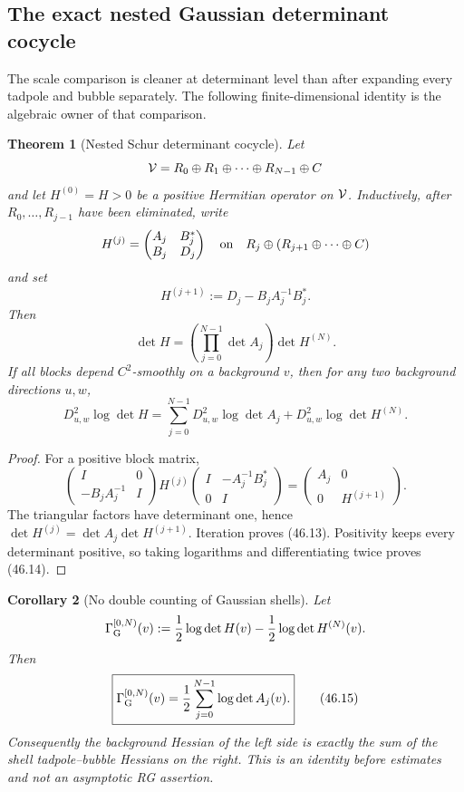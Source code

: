 \documentclass[11pt,oneside]{book}
\newtheorem{theorem}{Theorem}[chapter]
\newtheorem{corollary}[theorem]{Corollary}
\theoremstyle{definition}
\theoremstyle{remark}
\begin{document}
\subsection{The exact nested Gaussian determinant cocycle}

The scale comparison is cleaner at determinant level than after
expanding every tadpole and bubble separately.  The following
finite-dimensional identity is the algebraic owner of that
comparison.

\begin{theorem}[Nested Schur determinant cocycle]
\label{thm:e8v46-Schur-cocycle}
Let
\[
 {\cal V}=R_0\oplus R_1\oplus\cdots\oplus R_{N-1}\oplus C
\]
and let \(H^{(0)}=H>0\) be a positive Hermitian operator on
\({\cal V}\).  Inductively, after \(R_0,\ldots,R_{j-1}\) have been
eliminated, write
\[
 H^{(j)}
 =\begin{pmatrix}A_j&B_j^*\\ B_j&D_j\end{pmatrix}
 \quad\hbox{on}\quad
 R_j\oplus(R_{j+1}\oplus\cdots\oplus C)
\]
and set
\[
 H^{(j+1)}:=D_j-B_jA_j^{-1}B_j^*.                             \tag{46.12}
\]
Then
\[
 \boxed{\det H=\left(\prod_{j=0}^{N-1}\det A_j\right)
                 \det H^{(N)}.}                              \tag{46.13}
\]
If all blocks depend \(C^2\)-smoothly on a background \(v\), then
for any two background directions \(u,w\),
\[
 D^2_{u,w}\log\det H
 =\sum_{j=0}^{N-1}D^2_{u,w}\log\det A_j
  +D^2_{u,w}\log\det H^{(N)}.                                \tag{46.14}
\]
\end{theorem}

\begin{proof}
For a positive block matrix,
\[
 \begin{pmatrix}I&0\\-B_jA_j^{-1}&I\end{pmatrix}
 H^{(j)}
 \begin{pmatrix}I&-A_j^{-1}B_j^*\\0&I\end{pmatrix}
 =\begin{pmatrix}A_j&0\\0&H^{(j+1)}\end{pmatrix}.
\]
The triangular factors have determinant one, hence
\(\det H^{(j)}=\det A_j\det H^{(j+1)}\).  Iteration proves
(46.13).  Positivity keeps every determinant positive, so taking
logarithms and differentiating twice proves (46.14).
\end{proof}

\begin{corollary}[No double counting of Gaussian shells]
\label{cor:e8v46-shell-no-double-count}
Let
\[
 \Gamma^{[0,N)}_{\rm G}(v)
 :=\frac12\log\det H(v)-\frac12\log\det H^{(N)}(v).
\]
Then
\[
 \boxed{\Gamma^{[0,N)}_{\rm G}(v)
 =\frac12\sum_{j=0}^{N-1}\log\det A_j(v).}                    \tag{46.15}
\]
Consequently the background Hessian of the left side is exactly
the sum of the shell tadpole--bubble Hessians on the right.  This is
an identity before estimates and not an asymptotic RG assertion.
\end{corollary}
\end{document}

